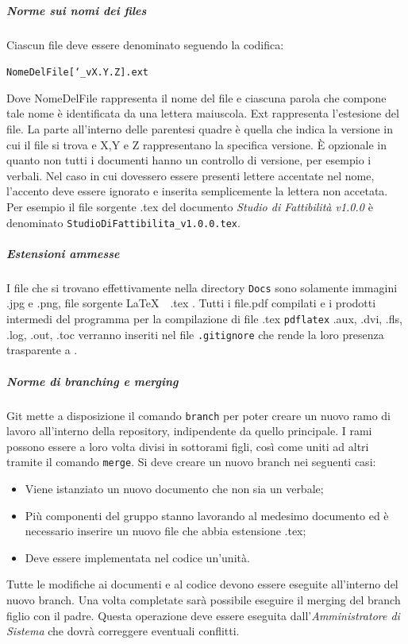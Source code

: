 \subparagraph{Norme sui nomi dei files} \Spazio
Ciascun file deve essere denominato seguendo la codifica:

\begin{center}
	\texttt{NomeDelFile[\char`_vX.Y.Z].ext}
\end{center}
Dove NomeDelFile rappresenta il nome del file e ciascuna parola che compone tale nome è identificata da una lettera maiuscola. Ext rappresenta l'estesione del file. La parte all'interno delle parentesi quadre è quella che indica la versione in cui il file si trova e X,Y e Z rappresentano la specifica versione. È opzionale in quanto non tutti i documenti hanno un controllo di versione, per esempio i verbali. Nel caso in cui dovessero essere presenti lettere accentate nel nome, l'accento deve essere ignorato e inserita semplicemente la lettera non accetata. Per esempio il file sorgente .tex del documento \emph{Studio di Fattibilità v1.0.0} è denominato \texttt{StudioDiFattibilita\_v1.0.0.tex}.

\subparagraph{Estensioni ammesse} \Spazio
I file che si trovano effettivamente nella directory \texttt{Docs} sono solamente immagini .jpg e .png, file sorgente \LaTeX $\text{ }$ .tex . Tutti i file.pdf compilati e i prodotti intermedi del programma per la compilazione di file .tex \texttt{pdflatex} .aux, .dvi, .fls, .log, .out, .toc verranno inseriti nel file \texttt{.gitignore} che rende la loro presenza trasparente a .

\subparagraph{Norme di branching e merging} \Spazio
Git mette a disposizione il comando \texttt{branch} per poter creare un nuovo ramo di lavoro all'interno della repository, indipendente da quello principale. I rami possono essere a loro volta divisi in sottorami figli, così come uniti ad altri tramite il comando \texttt{merge}. Si deve creare un nuovo branch nei seguenti casi:
\begin{itemize}
	\item Viene istanziato un nuovo documento che non sia un verbale;
	\item Più componenti del gruppo stanno lavorando al medesimo documento ed è necessario inserire un nuovo file che abbia estensione .tex;
	\item Deve essere implementata nel codice un'unità.
\end{itemize}
Tutte le modifiche ai documenti e al codice devono essere eseguite all'interno del nuovo branch. Una volta completate sarà possibile eseguire il merging del branch figlio con il padre. Questa operazione deve essere eseguita dall'\emph{Amministratore di Sistema} che dovrà correggere eventuali conflitti.

